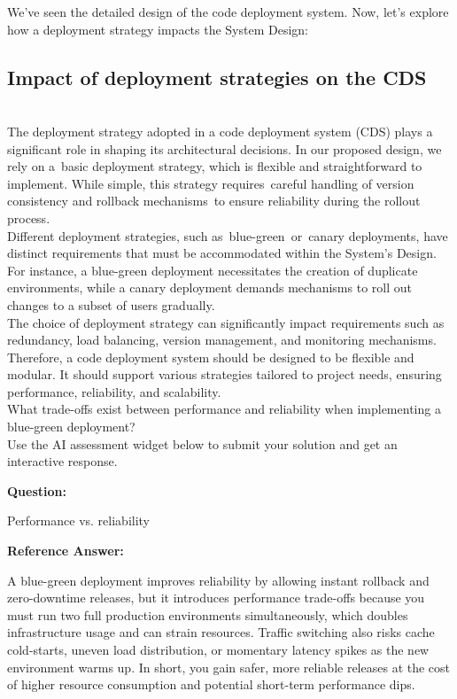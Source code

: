 We've seen the detailed design of the code deployment system. Now, let's explore how a deployment strategy impacts the System Design:

\subsection{Impact of deployment strategies on the CDS}\label{Fw-m_jnbeo8WduFajSqk0}
\\
The deployment strategy adopted in a code deployment system (CDS) plays a significant role in shaping its architectural decisions. In our proposed design, we rely on a~basic deployment strategy, which is flexible and straightforward to implement. While simple, this strategy requires~careful handling of version consistency and rollback mechanisms~to ensure reliability during the rollout process.
\\
Different deployment strategies, such as~blue-green~or~canary deployments, have distinct requirements that must be accommodated within the System's Design. For instance, a blue-green deployment necessitates the creation of duplicate environments, while a canary deployment demands mechanisms to roll out changes to a subset of users gradually.
\\
The choice of deployment strategy can significantly impact requirements such as redundancy, load balancing, version management, and monitoring mechanisms. Therefore, a code deployment system should be designed to be flexible and modular. It should support various strategies tailored to project needs, ensuring performance, reliability, and scalability.
\\
What trade-offs exist between performance and reliability when implementing a blue-green deployment?
\\
Use the AI assessment widget below to submit your solution and get an interactive response.

\textbf{Question:}

Performance vs. reliability 

\textbf{Reference Answer:}

A blue-green deployment improves reliability by allowing instant rollback and zero-downtime releases, but it introduces performance trade-offs because you must run two full production environments simultaneously, which doubles infrastructure usage and can strain resources. Traffic switching also risks cache cold-starts, uneven load distribution, or momentary latency spikes as the new environment warms up. In short, you gain safer, more reliable releases at the cost of higher resource consumption and potential short-term performance dips.

